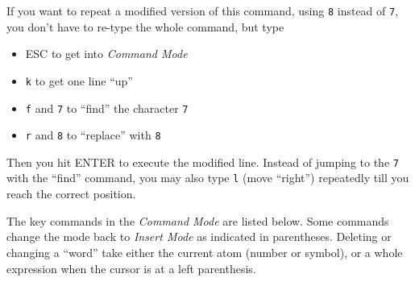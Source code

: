 If you want to repeat a modified version of this command, using \texttt{8}
instead of \texttt{7}, you don't have to re-type the whole command, but type

\begin{itemize}
\item ESC to get into \emph{Command Mode}
\item \texttt{k} to get one line ``up''
\item \texttt{f} and \texttt{7} to ``find'' the character \texttt{7}
\item \texttt{r} and \texttt{8} to ``replace'' with \texttt{8}
\end{itemize}

Then you hit ENTER to execute the modified line. Instead of jumping to
the \texttt{7} with the ``find'' command, you may also type \texttt{l} (move ``right'')
repeatedly till you reach the correct position.

The key commands in the \emph{Command Mode} are listed below. Some commands
change the mode back to \emph{Insert Mode} as indicated in parentheses.
Deleting or changing a ``word'' take either the current atom (number or
symbol), or a whole expression when the cursor is at a left parenthesis.

